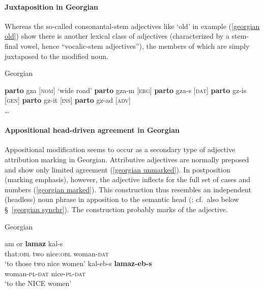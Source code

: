 \paragraph*{Juxtaposition in Georgian}
Whereas the so-called consonantal-stem adjectives like ‘old’ in example (\ref{georgian old}) show  there is another lexical class of adjectives (characterized by a stem-final vowel, hence “vocalic-stem adjectives”), the members of which are simply juxtaposed to the modified noun.
\begin{exe}
\ex \rm{Georgian \citep[236]{aronson1991}}
\begin{xlist}
\ex \textbf{parto} gza	\rm[{\textsc{nom}] ‘wide road’}
\ex \textbf{parto} gza-m	\rm[{\textsc{erg}]}
\ex \textbf{parto} gza-s	\rm[{\textsc{dat}]}
\ex \textbf{parto} gz-is	\rm[{\textsc{gen}]}
\ex \textbf{parto} gz-it	\rm[{\textsc{ins}]}
\ex \textbf{parto} gz-ad	\rm[{\textsc{adv}]}\\
\dots
\end{xlist}
\end{exe}

\paragraph*{Appositional head\hyp{}driven agreement in Georgian}
Appositional modification seems to occur as a secondary type of adjective attribution marking in Georgian. Attributive adjectives are normally preposed and show only limited agreement (\ref{georgian unmarked}). In postposition (marking emphasis), however, the adjective inflects for the full set of cases and numbers (\ref{georgian marked}). This construction thus resembles an independent (headless) noun phrase in apposition to the semantic head (\citealt[652, 677]{testelec1998}; cf.~also below \S~\ref{georgian synchr}). The construction probably marks  of the adjective.
\begin{exe}
\ex \rm{Georgian \citep[652]{testelec1998}}
\begin{xlist}
\label{georgian unmarked}
\ex 
\gll	am or \textbf{lamaz} kal-s\\
	that:\textsc{obl} two nice:\textsc{obl} woman-\textsc{dat}\\
\glt	‘to those two nice women’
\label{georgian marked}
\ex 
\gll	kal-eb-s \textbf{lamaz-eb-s}\\
	woman-\textsc{pl}-\textsc{dat} nice-\textsc{pl}-\textsc{dat}\\
\glt	‘to the NICE women’
\end{xlist}
\end{exe}

